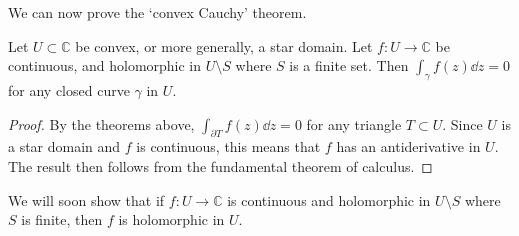 We can now prove the `convex Cauchy' theorem.
\begin{corollary}
	Let \( U \subset \mathbb C \) be convex, or more generally, a star domain.
	Let \( f \colon U \to \mathbb C \) be continuous, and holomorphic in \( U \setminus S \) where \( S \) is a finite set.
	Then \( \int_\gamma f(z) \dd{z} = 0 \) for any closed curve \( \gamma \) in \( U \).
\end{corollary}
\begin{proof}
	By the theorems above, \( \int_{\partial T} f(z) \dd{z} = 0 \) for any triangle \( T \subset U \).
	Since \( U \) is a star domain and \( f \) is continuous, this means that \( f \) has an antiderivative in \( U \).
	The result then follows from the fundamental theorem of calculus.
\end{proof}
\begin{remark}
	We will soon show that if \( f \colon U \to \mathbb C \) is continuous and holomorphic in \( U \setminus S \) where \( S \) is finite, then \( f \) is holomorphic in \( U \).
\end{remark}

